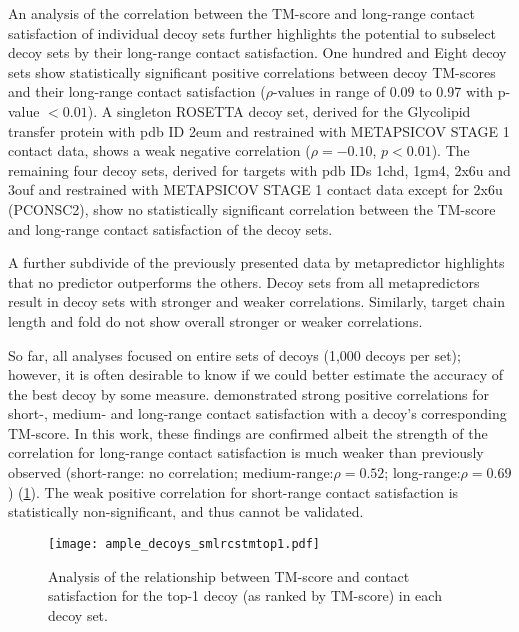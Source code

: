 An analysis of the correlation between the TM-score and long-range contact satisfaction of individual decoy sets further highlights the potential to subselect decoy sets by their long-range contact satisfaction. One hundred and Eight decoy sets show statistically significant positive correlations between decoy TM-scores and their long-range contact satisfaction ($\rho$-values in range of 0.09 to 0.97 with p-value $<0.01$). A singleton ROSETTA decoy set, derived for the Glycolipid transfer protein with \gls{pdb} ID 2eum and restrained with METAPSICOV STAGE 1 contact data, shows a weak negative correlation ($\rho=-0.10$, $p<0.01$). The remaining four decoy sets, derived for targets with \gls{pdb} IDs 1chd, 1gm4, 2x6u and 3ouf and restrained with METAPSICOV STAGE 1 contact data except for 2x6u (PCONSC2), show no statistically significant correlation between the TM-score and long-range contact satisfaction of the decoy sets. 

A further subdivide of the previously presented data by metapredictor highlights that no predictor outperforms the others. Decoy sets from all metapredictors result in decoy sets with stronger and weaker correlations. Similarly, target chain length and fold do not show overall stronger or weaker correlations. 

So far, all analyses focused on entire sets of decoys (1,000 decoys per set); however, it is often desirable to know if we could better estimate the accuracy of the best decoy by some measure. \textcite{Kosciolek2014-bt} demonstrated strong positive correlations for short-, medium- and long-range contact satisfaction with a decoy's corresponding TM-score. In this work, these findings are confirmed albeit the strength of the correlation for long-range contact satisfaction is much weaker than previously observed (short-range: no correlation; medium-range:$\rho=0.52$; long-range:$\rho=0.69$) (\cref{fig:ample_decoys_smlrcstmtop1}). The weak positive correlation for short-range contact satisfaction is statistically non-significant, and thus cannot be validated. 

\begin{figure}[H]
	\centering
        \texttt{[image: ample\_decoys\_smlrcstmtop1.pdf]}
        \caption[Top-1 decoy TM-score and contact satisfaction analysis]{Analysis of the relationship between TM-score and contact satisfaction for the top-1 decoy (as ranked by TM-score) in each decoy set.}
	\label{fig:ample_decoys_smlrcstmtop1}
\end{figure}




